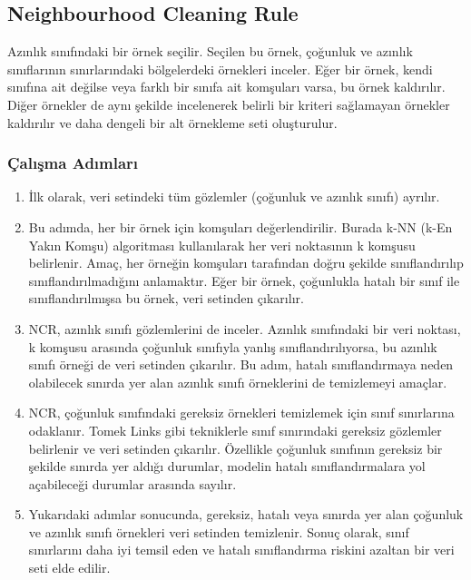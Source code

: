 \newpage

\subsection{Neighbourhood Cleaning Rule}
Azınlık sınıfındaki bir örnek seçilir. Seçilen bu örnek, çoğunluk ve azınlık sınıflarının sınırlarındaki bölgelerdeki örnekleri inceler. Eğer bir örnek, kendi sınıfına ait değilse veya farklı bir sınıfa ait komşuları varsa, bu örnek kaldırılır. Diğer örnekler de aynı şekilde incelenerek belirli bir kriteri sağlamayan örnekler kaldırılır ve daha dengeli bir alt örnekleme seti oluşturulur.

\subsubsection{Çalışma Adımları}

\begin{enumerate}
    \item İlk olarak, veri setindeki tüm gözlemler (çoğunluk ve azınlık sınıfı) ayrılır.
    \item Bu adımda, her bir örnek için komşuları değerlendirilir. Burada k-NN (k-En Yakın Komşu) algoritması kullanılarak her veri noktasının k komşusu belirlenir. Amaç, her örneğin komşuları tarafından doğru şekilde sınıflandırılıp sınıflandırılmadığını anlamaktır. Eğer bir örnek, çoğunlukla hatalı bir sınıf ile sınıflandırılmışsa bu örnek, veri setinden çıkarılır.
    \item NCR, azınlık sınıfı gözlemlerini de inceler. Azınlık sınıfındaki bir veri noktası, k komşusu arasında çoğunluk sınıfıyla yanlış sınıflandırılıyorsa, bu azınlık sınıfı örneği de veri setinden çıkarılır. Bu adım, hatalı sınıflandırmaya neden olabilecek sınırda yer alan azınlık sınıfı örneklerini de temizlemeyi amaçlar.
    \item NCR, çoğunluk sınıfındaki gereksiz örnekleri temizlemek için sınıf sınırlarına odaklanır. Tomek Links gibi tekniklerle sınıf sınırındaki gereksiz gözlemler belirlenir ve veri setinden çıkarılır. Özellikle çoğunluk sınıfının gereksiz bir şekilde sınırda yer aldığı durumlar, modelin hatalı sınıflandırmalara yol açabileceği durumlar arasında sayılır.
    \item Yukarıdaki adımlar sonucunda, gereksiz, hatalı veya sınırda yer alan çoğunluk ve azınlık sınıfı örnekleri veri setinden temizlenir. Sonuç olarak, sınıf sınırlarını daha iyi temsil eden ve hatalı sınıflandırma riskini azaltan bir veri seti elde edilir.
\end{enumerate}

